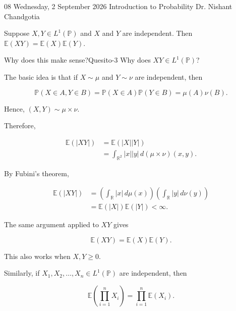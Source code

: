 
\lecture
{08}
{Wednesday, 2 September 2026}
{Introduction to Probability}
{Dr. Nishant Chandgotia}


Suppose $X,Y\in L^1(\mathbb{P})$ and $X$ and $Y$ are independent.
Then
\(
    \mathbb{E}(XY)
    =
    \mathbb{E}(X)\mathbb{E}(Y).
\)

\begin{question}{Why does this make sense?}{Quesito-3}
    Why does \(XY \in L^{1}\left( \mathbb{P} \right)\)?
\end{question}

\begin{remark}
The basic idea is that if $X\sim\mu$ and $Y\sim\nu$ are
independent, then

\[
    \mathbb{P}(X\in A,Y\in B)
    =
    \mathbb{P}(X\in A)\mathbb{P}(Y\in B)
    =
    \mu(A)\nu(B).
\]

Hence,
\(
    (X,Y)\sim\mu\times\nu.
\)

Therefore,

\[
\begin{aligned}
    \mathbb{E}(|XY|)
    &=
    \mathbb{E}(|X||Y|) \\
    &=
    \int_{\mathbb{R}^2}
    |x||y|\,d(\mu\times\nu)(x,y).
\end{aligned}
\]

By Fubini's theorem,

\[
\begin{aligned}
    \mathbb{E}(|XY|)
    &=
    \left(
        \int_{\mathbb{R}} |x|\,d\mu(x)
    \right)
    \left(
        \int_{\mathbb{R}} |y|\,d\nu(y)
    \right) \\
    &=
    \mathbb{E}(|X|)\mathbb{E}(|Y|)
    <\infty.
\end{aligned}
\]

The same argument applied to $XY$ gives

\[
    \mathbb{E}(XY)
    =
    \mathbb{E}(X)\mathbb{E}(Y).
\]

This also works when $X,Y\geq 0$.

Similarly, if
\(
    X_1,X_2,\ldots,X_n\in L^1(\mathbb{P})
\)
are independent, then

\[
    \mathbb{E}
    \left(
        \prod_{i=1}^n X_i
    \right)
    =
    \prod_{i=1}^n \mathbb{E}(X_i).
\]
\end{remark}

